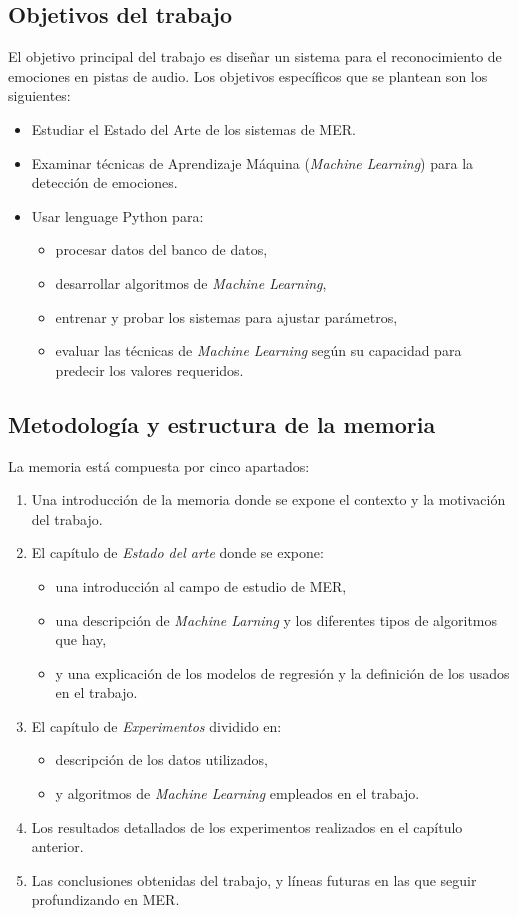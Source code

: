 \documentclass[12pt,a4paper]{article}
\begin{document}
\subsection{Objetivos del trabajo}
El objetivo principal del trabajo es diseñar un sistema para el reconocimiento de emociones en pistas de audio.
Los objetivos específicos que se plantean son los siguientes:
\begin{itemize}
\item Estudiar el Estado del Arte de los sistemas de MER.
\item Examinar técnicas de Aprendizaje Máquina (\textit{Machine Learning}) para la detección de emociones.
\item Usar lenguage Python para:
 	\begin{itemize}
 		\item procesar datos del banco de datos, 
 		\item desarrollar algoritmos de \textit{Machine Learning},
 		\item entrenar y probar los sistemas para ajustar parámetros,
 		\item evaluar las técnicas de \textit{Machine Learning} según su capacidad para predecir los valores requeridos. 		
 	\end{itemize}
\end{itemize}

\subsection{Metodología y estructura de la memoria}
La memoria está compuesta por cinco apartados:
\begin{enumerate}
	\item Una introducción de la memoria donde se expone el contexto y la motivación del trabajo.
	\item El capítulo de \textit{Estado del arte} donde se expone:
	\begin{itemize}
		\item una introducción al campo de estudio de MER,
		\item una descripción de \textit{Machine Larning} y los diferentes tipos de algoritmos que hay, 
		\item y una explicación de los modelos de regresión y la definición de los usados en el trabajo.
	\end{itemize}
	\item El capítulo de \textit{Experimentos} dividido en:
	\begin{itemize}
		\item descripción de los datos utilizados,
		\item y algoritmos de \textit{Machine Learning} empleados en el trabajo.
	\end{itemize}
	\item Los resultados detallados de los experimentos realizados en el capítulo anterior.
	\item Las conclusiones obtenidas del trabajo, y líneas futuras en las que seguir profundizando en MER.
\end{enumerate}
\end{document}
